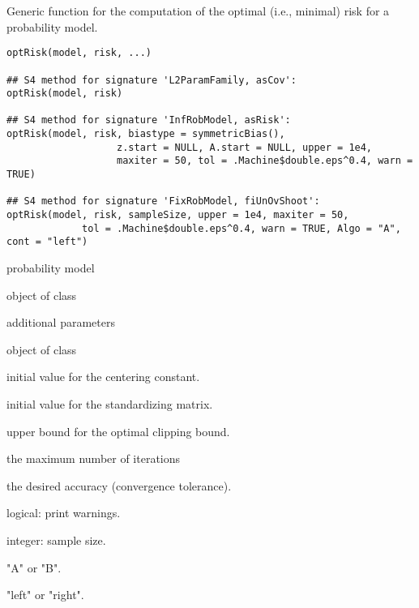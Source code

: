 \begin{Description}\relax
Generic function for the computation of the optimal (i.e., minimal) 
risk for a probability model.
\end{Description}
\begin{Usage}
\begin{verbatim}
optRisk(model, risk, ...)

## S4 method for signature 'L2ParamFamily, asCov':
optRisk(model, risk)

## S4 method for signature 'InfRobModel, asRisk':
optRisk(model, risk, biastype = symmetricBias(),
                   z.start = NULL, A.start = NULL, upper = 1e4, 
                   maxiter = 50, tol = .Machine$double.eps^0.4, warn = TRUE)

## S4 method for signature 'FixRobModel, fiUnOvShoot':
optRisk(model, risk, sampleSize, upper = 1e4, maxiter = 50, 
             tol = .Machine$double.eps^0.4, warn = TRUE, Algo = "A", cont = "left")
\end{verbatim}
\end{Usage}
\begin{Arguments}
\begin{ldescription}
\item[\code{model}] probability model 
\item[\code{risk}] object of class  
\item[\code{...}] additional parameters 
\item[\code{biastype}] object of class  
\item[\code{z.start}] initial value for the centering constant. 
\item[\code{A.start}] initial value for the standardizing matrix. 
\item[\code{upper}] upper bound for the optimal clipping bound. 
\item[\code{maxiter}] the maximum number of iterations 
\item[\code{tol}] the desired accuracy (convergence tolerance).
\item[\code{warn}] logical: print warnings. 
\item[\code{sampleSize}] integer: sample size. 
\item[\code{Algo}] "A" or "B". 
\item[\code{cont}] "left" or "right". 
\end{ldescription}
\end{Arguments}
